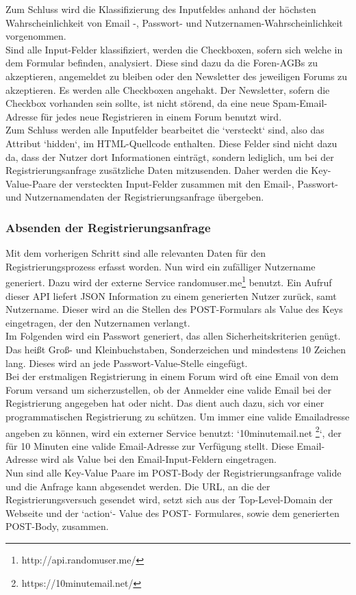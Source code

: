 Zum Schluss wird die Klassifizierung des Inputfeldes anhand der höchsten Wahrscheinlichkeit von Email -, Passwort- und Nutzernamen-Wahrscheinlichkeit vorgenommen. \\
Sind alle Input-Felder klassifiziert, werden die Checkboxen, sofern sich welche in dem Formular befinden, analysiert. Diese sind dazu da die Foren-AGBs zu akzeptieren, angemeldet zu bleiben oder den Newsletter des jeweiligen Forums zu akzeptieren.
Es werden alle Checkboxen angehakt. Der Newsletter, sofern die Checkbox vorhanden sein sollte, ist nicht störend, da eine neue Spam-Email-Adresse für jedes neue Registrieren in einem Forum benutzt wird.\\
Zum Schluss werden alle Inputfelder bearbeitet die `versteckt` sind, also das Attribut `hidden`, im HTML-Quellcode enthalten.
Diese Felder sind nicht dazu da, dass der Nutzer dort Informationen einträgt, sondern lediglich, um bei der Registrierungsanfrage zusätzliche Daten mitzusenden. Daher werden die Key-Value-Paare der versteckten Input-Felder zusammen mit den Email-, Passwort- und Nutzernamendaten der Registrierungsanfrage übergeben.

\subsubsection{Absenden der Registrierungsanfrage}
Mit dem vorherigen Schritt sind alle relevanten Daten für den Registrierungsprozess erfasst worden. Nun wird ein zufälliger Nutzername generiert. Dazu wird der externe Service randomuser.me\footnote{http://api.randomuser.me/} benutzt. Ein Aufruf dieser API liefert JSON Information zu einem generierten Nutzer zurück, samt Nutzername. Dieser wird an die Stellen des POST-Formulars als Value des Keys eingetragen, der den Nutzernamen verlangt.\\
Im Folgenden wird ein Passwort generiert, das allen Sicherheitskriterien genügt. Das heißt Groß- und Kleinbuchstaben, Sonderzeichen und mindestens 10 Zeichen lang. Dieses wird an jede Passwort-Value-Stelle eingefügt.\\
Bei der erstmaligen Registrierung in einem Forum wird oft eine Email von dem Forum versand um sicherzustellen, ob der Anmelder eine valide Email bei der Registrierung angegeben hat oder nicht. Das dient auch dazu, sich vor einer programmatischen Registrierung zu schützen. Um immer eine valide Emailadresse angeben zu können, wird ein externer Service benutzt: `10minutemail.net \footnote{https://10minutemail.net/}`, der für 10 Minuten eine valide Email-Adresse zur Verfügung stellt. Diese Email-Adresse wird als Value bei den Email-Input-Feldern eingetragen.\\
Nun sind alle Key-Value Paare im POST-Body der Registrierungsanfrage valide und die Anfrage kann abgesendet werden.
Die URL, an die der Registrierungsversuch gesendet wird, setzt sich aus der Top-Level-Domain der Webseite und der `action`- Value des POST- Formulares, sowie dem generierten POST-Body, zusammen.

